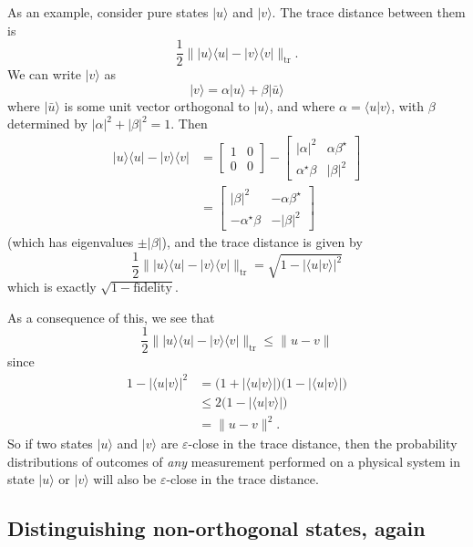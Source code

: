 \documentclass[fleqn,a4paper]{article}
\theoremstyle{definition}
\theoremstyle{definition}
\theoremstyle{definition}
\theoremstyle{definition}
\theoremstyle{remark}
\begin{document}
As an example, consider pure states \(|u\rangle\) and \(|v\rangle\).
The trace distance between them is
\[
  \frac{1}{2}\||u\rangle\langle u|-|v\rangle\langle v|\|_{\operatorname{tr}}.
\]
We can write \(|v\rangle\) as
\[
  |v\rangle = \alpha|u\rangle + \beta|\bar{u}\rangle
\]
where \(|\bar{u}\rangle\) is some unit vector orthogonal to \(|u\rangle\), and where \(\alpha=\langle u|v\rangle\), with \(\beta\) determined by \(|\alpha|^2+|\beta|^2=1\).
Then
\[
  \begin{aligned}
    |u\rangle\langle u| - |v\rangle\langle v|
    &= \begin{bmatrix}1&0\\0&0\end{bmatrix} - \begin{bmatrix}|\alpha|^2&\alpha\beta^\star\\\alpha^\star\beta&|\beta|^2\end{bmatrix}
  \\&= \begin{bmatrix}|\beta|^2&-\alpha\beta^\star\\-\alpha^\star\beta&-|\beta|^2\end{bmatrix}
  \end{aligned}
\]
(which has eigenvalues \(\pm|\beta|\)), and the trace distance is given by
\[
  \frac{1}{2}\||u\rangle\langle u|-|v\rangle\langle v|\|_{\operatorname{tr}} = \sqrt{1-|\langle u|v\rangle|^2}
\]
which is exactly \(\sqrt{1-\text{fidelity}}\).

As a consequence of this, we see that
\[
  \frac{1}{2}\||u\rangle\langle u|-|v\rangle\langle v|\|_{\operatorname{tr}}
  \leqslant\|u-v\|
\]
since
\[
  \begin{aligned}
    1 - |\langle u|v\rangle|^2
    &= \Big( 1+|\langle u|v\rangle| \Big) \Big( 1-|\langle u|v\rangle| \Big)
  \\&\leqslant 2\Big( 1-|\langle u|v\rangle| \Big)
  \\&= \|u-v\|^2.
  \end{aligned}
\]
So if two states \(|u\rangle\) and \(|v\rangle\) are \(\varepsilon\)-close in the trace distance, then the probability distributions of outcomes of \emph{any} measurement performed on a physical system in state \(|u\rangle\) or \(|v\rangle\) will also be \(\varepsilon\)-close in the trace distance.

\hypertarget{distinguishing-non-orthogonal-states-again}{%
\subsection{Distinguishing non-orthogonal states, again}\label{distinguishing-non-orthogonal-states-again}}
\end{document}
